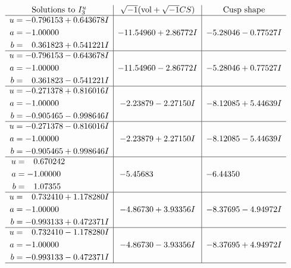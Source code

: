 \documentclass[1p]{elsarticle_modified}
\theoremstyle{definition}
\newcommand{\I}{\sqrt{-1}}
\begin{document}
$$\begin{array}{c|c|c}  
\text{Solutions to }I^u_{3}& \I (\text{vol} + \sqrt{-1}CS) & \text{Cusp shape}\\
 \hline 
\begin{aligned}
u &= -0.796153 + 0.643678 I \\
a &= -1.00000\phantom{ +0.000000I} \\
b &= \phantom{-}0.361823 + 0.541221 I\end{aligned}
 & -11.54960 + 2.86772 I & -5.28046 - 0.77527 I \\ \hline\begin{aligned}
u &= -0.796153 - 0.643678 I \\
a &= -1.00000\phantom{ +0.000000I} \\
b &= \phantom{-}0.361823 - 0.541221 I\end{aligned}
 & -11.54960 - 2.86772 I & -5.28046 + 0.77527 I \\ \hline\begin{aligned}
u &= -0.271378 + 0.816016 I \\
a &= -1.00000\phantom{ +0.000000I} \\
b &= -0.905465 - 0.998646 I\end{aligned}
 & -2.23879 - 2.27150 I & -8.12085 + 5.44639 I \\ \hline\begin{aligned}
u &= -0.271378 - 0.816016 I \\
a &= -1.00000\phantom{ +0.000000I} \\
b &= -0.905465 + 0.998646 I\end{aligned}
 & -2.23879 + 2.27150 I & -8.12085 - 5.44639 I \\ \hline\begin{aligned}
u &= \phantom{-}0.670242\phantom{ +0.000000I} \\
a &= -1.00000\phantom{ +0.000000I} \\
b &= \phantom{-}1.07355\phantom{ +0.000000I}\end{aligned}
 & -5.45683\phantom{ +0.000000I} & -6.44350\phantom{ +0.000000I} \\ \hline\begin{aligned}
u &= \phantom{-}0.732410 + 1.178280 I \\
a &= -1.00000\phantom{ +0.000000I} \\
b &= -0.993133 + 0.472371 I\end{aligned}
 & -4.86730 + 3.93356 I & -8.37695 - 4.94972 I \\ \hline\begin{aligned}
u &= \phantom{-}0.732410 - 1.178280 I \\
a &= -1.00000\phantom{ +0.000000I} \\
b &= -0.993133 - 0.472371 I\end{aligned}
 & -4.86730 - 3.93356 I & -8.37695 + 4.94972 I\\
 \hline 
 \end{array}$$\newpage
\end{document}
